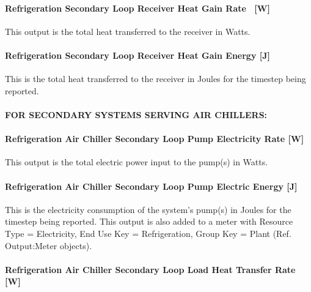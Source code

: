 \paragraph{Refrigeration Secondary Loop Receiver Heat Gain Rate~ {[}W{]}}\label{refrigeration-secondary-loop-receiver-heat-gain-rate-w}

This output is the total heat transferred to the receiver in Watts.

\paragraph{Refrigeration Secondary Loop Receiver Heat Gain Energy {[}J{]}}\label{refrigeration-secondary-loop-receiver-heat-gain-energy-j}

This is the total heat transferred to the receiver in Joules for the timestep being reported.

\paragraph{FOR SECONDARY SYSTEMS SERVING AIR CHILLERS:}\label{for-secondary-systems-serving-air-chillers}

\paragraph{Refrigeration Air Chiller Secondary Loop Pump Electricity Rate {[}W{]}}\label{refrigeration-air-chiller-secondary-loop-pump-electric-power-w}

This output is the total electric power input to the pump(s) in Watts.

\paragraph{Refrigeration Air Chiller Secondary Loop Pump Electric Energy {[}J{]}}\label{refrigeration-air-chiller-secondary-loop-pump-electric-energy-j}

This is the electricity consumption of the system's pump(s) in Joules for the timestep being reported. This output is also added to a meter with Resource Type = Electricity, End Use Key = Refrigeration, Group Key = Plant (Ref. Output:Meter objects).

\paragraph{Refrigeration Air Chiller Secondary Loop Load Heat Transfer Rate {[}W{]}}\label{refrigeration-air-chiller-secondary-loop-load-heat-transfer-rate-w}

